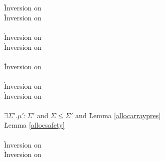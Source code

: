 \begin{description}
\item[] \ \\
  \begin{tabbing}
   \\
    \` Inversion on  \\
    \` Inversion on  \\
   \\
    \` Inversion on  \\
    \` Inversion on  \\
  \\
    \` Inversion on  \\
   \\
    \` Inversion on  \\
    \` Inversion on  \\
  \\
  $\exists \Sigma'.\mu' : \Sigma'$ and $\Sigma \le \Sigma'$ and 
    \` Lemma \ref{allocarraypres} \\
    \` Lemma \ref{allocsafety} \\
   \\
    \` Inversion on  \\
    \` Inversion on  \\

\end{tabbing}
\end{description}
